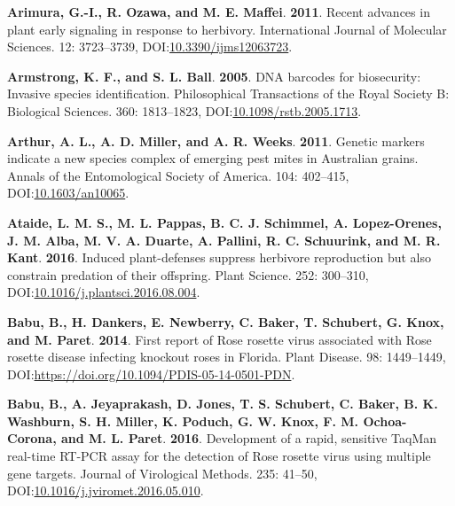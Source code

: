 \documentclass[12pt,final,CPage]{ufthesis}
\newlength{\cslhangindent}
\newenvironment{CSLReferences}[2] %
{%
	\setlength{\parindent}{0pt}
	\ifodd #1 \everypar{\setlength{\hangindent}{\cslhangindent}}\ignorespaces\fi
	\ifnum #2 > 0
	\setlength{\parskip}{#2\baselineskip}
	\fi
}%
{}
\begin{document}
{\begin{CSLReferences}{1}{0}
  \leavevmode{}%
  \textbf{Arimura, G.-I., R. Ozawa, and M. E. Maffei}. \textbf{2011}. Recent advances in plant early signaling in response to herbivory. International Journal of Molecular Sciences. 12: 3723--3739, DOI:\href{https://doi.org/10.3390/ijms12063723}{10.3390/ijms12063723}.

  \leavevmode{}%
  \textbf{Armstrong, K. F., and S. L. Ball}. \textbf{2005}. {DNA} barcodes for biosecurity: Invasive species identification. Philosophical Transactions of the Royal Society B: Biological Sciences. 360: 1813--1823, DOI:\href{https://doi.org/10.1098/rstb.2005.1713}{10.1098/rstb.2005.1713}.

  \leavevmode{}%
  \textbf{Arthur, A. L., A. D. Miller, and A. R. Weeks}. \textbf{2011}. Genetic markers indicate a new species complex of emerging pest mites in {Australian} grains. Annals of the Entomological Society of America. 104: 402--415, DOI:\href{https://doi.org/10.1603/an10065}{10.1603/an10065}.

  \leavevmode{}%
  \textbf{Ataide, L. M. S., M. L. Pappas, B. C. J. Schimmel, A. Lopez-Orenes, J. M. Alba, M. V. A. Duarte, A. Pallini, R. C. Schuurink, and M. R. Kant}. \textbf{2016}. Induced plant-defenses suppress herbivore reproduction but also constrain predation of their offspring. Plant Science. 252: 300--310, DOI:\href{https://doi.org/10.1016/j.plantsci.2016.08.004}{10.1016/j.plantsci.2016.08.004}.

  \leavevmode{}%
  \textbf{Babu, B., H. Dankers, E. Newberry, C. Baker, T. Schubert, G. Knox, and M. Paret}. \textbf{2014}. First report of {Rose rosette virus} associated with {Rose rosette disease} infecting knockout roses in {Florida}. Plant Disease. 98: 1449--1449, DOI:\url{https://doi.org/10.1094/PDIS-05-14-0501-PDN}.

  \leavevmode{}%
  \textbf{Babu, B., A. Jeyaprakash, D. Jones, T. S. Schubert, C. Baker, B. K. Washburn, S. H. Miller, K. Poduch, G. W. Knox, F. M. Ochoa-Corona, and M. L. Paret}. \textbf{2016}. Development of a rapid, sensitive {TaqMan} real-time {RT}-{PCR} assay for the detection of {Rose rosette virus} using multiple gene targets. Journal of Virological Methods. 235: 41--50, DOI:\href{https://doi.org/10.1016/j.jviromet.2016.05.010}{10.1016/j.jviromet.2016.05.010}.


\end{CSLReferences}}
\end{document}
